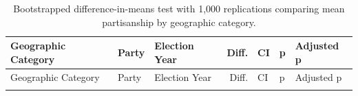 \documentclass[10pt,]{article}
\begin{document}
\begin{longtable}[]{@{}lllrlll@{}}
\caption{Bootstrapped difference-in-means test with 1,000 replications
comparing mean partisanship by geographic category.}\tabularnewline
\toprule
\begin{minipage}[b]{0.21\columnwidth}\raggedright
Geographic Category\strut
\end{minipage} & \begin{minipage}[b]{0.09\columnwidth}\raggedright
Party\strut
\end{minipage} & \begin{minipage}[b]{0.17\columnwidth}\raggedright
Election Year\strut
\end{minipage} & \begin{minipage}[b]{0.07\columnwidth}\raggedleft
Diff.\strut
\end{minipage} & \begin{minipage}[b]{0.13\columnwidth}\raggedright
CI\strut
\end{minipage} & \begin{minipage}[b]{0.05\columnwidth}\raggedright
p\strut
\end{minipage} & \begin{minipage}[b]{0.09\columnwidth}\raggedright
Adjusted p\strut
\end{minipage}\tabularnewline
\midrule
\endfirsthead
\toprule
\begin{minipage}[b]{0.21\columnwidth}\raggedright
Geographic Category\strut
\end{minipage} & \begin{minipage}[b]{0.09\columnwidth}\raggedright
Party\strut
\end{minipage} & \begin{minipage}[b]{0.17\columnwidth}\raggedright
Election Year\strut
\end{minipage} & \begin{minipage}[b]{0.07\columnwidth}\raggedleft
Diff.\strut
\end{minipage} & \begin{minipage}[b]{0.13\columnwidth}\raggedright
CI\strut
\end{minipage} & \begin{minipage}[b]{0.05\columnwidth}\raggedright
p\strut
\end{minipage} & \begin{minipage}[b]{0.09\columnwidth}\raggedright
Adjusted p\strut
\end{minipage}\tabularnewline
\midrule
\endhead
\begin{minipage}[t]{0.21\columnwidth}\raggedright

\end{minipage}
\end{longtable}
\end{document}
